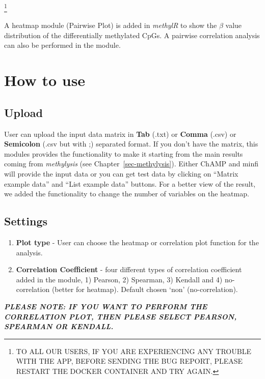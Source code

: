 \documentclass[
  a4paper,
  DIV=11,
  numbers=noendperiod,
  oneside,
  open=any]{scrreport}
\providecommand{\tightlist}{%
  \setlength{\itemsep}{0pt}\setlength{\parskip}{0pt}}\usepackage{longtable,booktabs,array}
\begin{document}
\footnote{TO ALL OUR USERS, IF YOU ARE EXPERIENCING ANY TROUBLE WITH THE
  APP, BEFORE SENDING THE BUG REPORT, PLEASE RESTART THE DOCKER
  CONTAINER AND TRY AGAIN.}

A heatmap module (Pairwise Plot) is added in \emph{methylR} to show the
\(\beta\) value distribution of the differentially methylated CpGs. A
pairwise correlation analysis can also be performed in the module.

\section{How to use}\label{how-to-use-4}

\subsection{Upload}\label{upload}

User can upload the input data matrix in \textbf{Tab} (.txt) or
\textbf{Comma} (.csv) or \textbf{Semicolon} (.csv but with ;) separated
format. If you don't have the matrix, this modules provides the
functionality to make it starting from the main results coming from
\emph{methylysis} (see Chapter~\ref{sec-methylysis}). Either ChAMP and
minfi will provide the input data or you can get test data by clicking
on ``Matrix example data'' and ``List example data'' buttons. For a
better view of the result, we added the functionality to change the
number of variables on the heatmap.

\subsection{Settings}\label{settings}

\begin{enumerate}
\def\labelenumi{\arabic{enumi}.}
\tightlist
\item
  \textbf{Plot type} - User can choose the heatmap or correlation plot
  function for the analysis.
\item
  \textbf{Correlation Coefficient} - four different types of correlation
  coefficient added in the module, 1) Pearson, 2) Spearman, 3) Kendall
  and 4) no-correlation (better for heatmap). Default chosen `non'
  (no-correlation).
\end{enumerate}

\begin{tcolorbox}[enhanced jigsaw, breakable, colback=white, colbacktitle=quarto-callout-important-color!10!white, opacityback=0, left=2mm, bottomrule=.15mm, opacitybacktitle=0.6, coltitle=black, bottomtitle=1mm, toprule=.15mm, toptitle=1mm, arc=.35mm, titlerule=0mm, rightrule=.15mm, title=\textcolor{quarto-callout-important-color}{\faExclamation}\hspace{0.5em}{Important}, colframe=quarto-callout-important-color-frame, leftrule=.75mm]

\textbf{\emph{PLEASE NOTE: IF YOU WANT TO PERFORM THE CORRELATION PLOT,
THEN PLEASE SELECT PEARSON, SPEARMAN OR KENDALL.}}

\end{tcolorbox}
\end{document}
